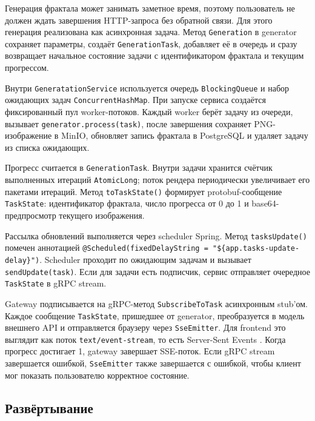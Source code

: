 \subsubsection{}

Генерация фрактала может занимать заметное время, поэтому пользователь не должен ждать завершения HTTP-запроса без обратной связи. Для этого генерация реализована как асинхронная задача. Метод \texttt{Generation} в generator сохраняет параметры, создаёт \texttt{GenerationTask}, добавляет её в очередь и сразу возвращает начальное состояние задачи с идентификатором фрактала и текущим прогрессом.

Внутри \texttt{GeneratationService} используется очередь \texttt{BlockingQueue} и набор ожидающих задач \texttt{ConcurrentHashMap}. При запуске сервиса создаётся фиксированный пул worker-потоков. Каждый worker берёт задачу из очереди, вызывает \texttt{generator.process(task)}, после завершения сохраняет PNG-изображение в MinIO, обновляет запись фрактала в PostgreSQL и удаляет задачу из списка ожидающих.

Прогресс считается в \texttt{GenerationTask}. Внутри задачи хранится счётчик выполненных итераций \texttt{AtomicLong}; поток рендера периодически увеличивает его пакетами итераций. Метод \texttt{toTaskState()} формирует protobuf-сообщение \texttt{TaskState}: идентификатор фрактала, число прогресса от 0 до 1 и base64-предпросмотр текущего изображения.

Рассылка обновлений выполняется через scheduler Spring. Метод \texttt{tasksUpdate()} помечен аннотацией \texttt{@Scheduled(fixedDelayString = "\$\{app.tasks-update-delay\}")}. Scheduler проходит по ожидающим задачам и вызывает \texttt{sendUpdate(task)}. Если для задачи есть подписчик, сервис отправляет очередное \texttt{TaskState} в gRPC stream.

Gateway подписывается на gRPC-метод \texttt{SubscribeToTask} асинхронным stub'ом. Каждое сообщение \texttt{TaskState}, пришедшее от generator, преобразуется в модель внешнего API и отправляется браузеру через \texttt{SseEmitter}. Для frontend это выглядит как поток \texttt{text/event-stream}, то есть Server-Sent Events \cite{mdn_sse}. Когда прогресс достигает 1, gateway завершает SSE-поток. Если gRPC stream завершается ошибкой, \texttt{SseEmitter} также завершается с ошибкой, чтобы клиент мог показать пользователю корректное состояние.

\subsection{Развёртывание}


